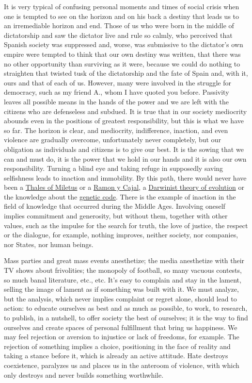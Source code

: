 \documentclass[]{book}
\begin{document}
It is very typical of confusing personal moments and times of social crisis when one is tempted to see on the horizon and on his back a destiny that leads us to an irremediable horizon and end. Those of us who were born in the middle of dictatorship and saw the dictator live and rule so calmly, who perceived that Spanish society was suppressed and, worse, was submissive to the dictator's own empire were tempted to think that our own destiny was written, that there was no other opportunity than surviving as it were, because we could do nothing to straighten that twisted tusk of the dictatorship and the fate of Spain and, with it, ours and that of each of us. However, many were involved in the struggle for democracy, such as my friend A., whom I have quoted you before. Passivity leaves all possible means in the hands of the power and we are left with the citizens who are defenseless and subdued. It is true that in our society mediocrity abounds even in the positions of greatest responsibility, but this is what we have so far. The horizon is clear, and mediocrity, indifference, inaction, and even violence are gradually overcome, unfortunately never completely, but our obligation as individuals and citizens is to give our best. It is the sowing that we can and must do, it is the power that we hold in our hands and it is also our own responsibility. Turning a blind eye and taking refuge in supposedly saving selfishness leads to inaction and immobility. By this path, there would never have been a \href{https://en.wikipedia.org/wiki/Thales_of_Miletus}{Thales of Miletus} or a \href{https://en.wikipedia.org/wiki/Santiago_Ram\%C3\%B3n_y_Cajal}{Ramon y Cajal}, a \href{https://en.wikipedia.org/wiki/Evolution}{Darwinist theory of evolution} or the knowledge about the \href{https://en.wikipedia.org/wiki/Genetic_code}{genetic code}. There is the example of inaction in the field of knowledge that occurred during the Middle Ages. Involving oneself implies commitment and generosity, but without them, together with other values, such as the impulse for the search for truth, the love of justice, the respect or the dialogue, for example, nothing improves, neither society, nor companies, nor States, nor human beings.

Mass parties and great mass events anesthetize; the media anesthetize with their TV shows about frivolities; the monopoly of football, so many vacuous contests, so much banal literature, etc., etc. It's easy to complain and stay in the lament, selling the image of lament as if something was built with it. We must analyze, but the analysis, which never implies complaint or regret alone, should lead to action: to educate ourselves as best and as much as possible, to work, to research, to publish, in a nutshell, to offer society the best of ourselves; it is the way to find ourselves and create spaces of personal fulfillment that bring us happiness. We may feel rejection or aversion to injustice or lack of freedoms, for example. The rejection of something implies a choice, positioning in the face of reality and taking a stance before it, which is already an active attitude. Hate destroys coexistence, paralyzes us and places us in the anteroom of violence, with which only destroys and never builds something worthwhile.
\end{document}

